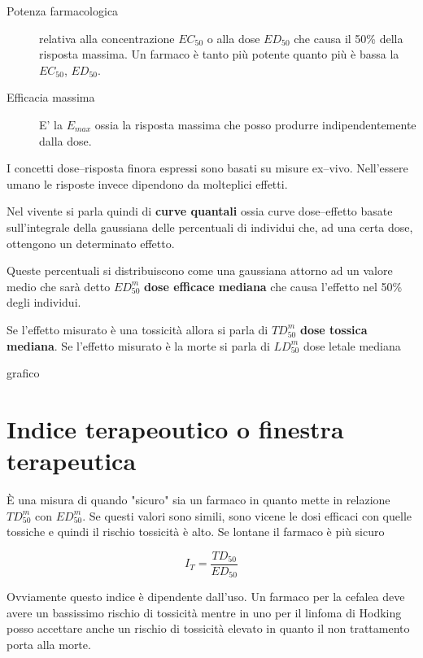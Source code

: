 \begin{description}
\item[Potenza farmacologica] relativa alla concentrazione $EC_{50}$ o alla dose $ED_{50}$ che causa il 50\% della risposta massima. Un farmaco è tanto più potente quanto più è bassa la $EC_{50}$, $ED_{50}$.

\item[Efficacia massima] E' la $E_{max}$ ossia la risposta massima che posso produrre indipendentemente dalla dose.
\end{description}

I concetti dose--risposta finora espressi sono basati su misure ex--vivo. Nell'essere umano le risposte invece dipendono da molteplici effetti.

Nel vivente si parla quindi di \textbf{curve quantali} ossia curve dose--effetto basate sull'integrale della gaussiana delle percentuali di individui che, ad una certa dose, ottengono un determinato effetto.

Queste percentuali si distribuiscono come una gaussiana attorno ad un valore medio che sarà detto $ED_{50}^m$ \textbf{dose efficace mediana} che causa l'effetto nel 50\% degli individui.

Se l'effetto misurato è una tossicità allora si parla di $TD_{50}^m$ \textbf{dose tossica mediana}. Se l'effetto misurato è la morte si parla di $LD_{50}^m$ dose letale mediana

{grafico}

\section{Indice terapeoutico o finestra terapeutica}

\`E una misura di quando "sicuro" sia un farmaco in quanto mette in relazione $TD_{50}^m$ con $ED_{50}^m$. Se questi valori sono simili, sono vicene le dosi efficaci con quelle tossiche e quindi il rischio tossicità è alto. Se lontane il farmaco è più sicuro

$$I_T=\frac{TD_{50}}{ED_{50}}$$

Ovviamente questo indice è dipendente dall'uso. Un farmaco per la cefalea deve avere un bassissimo rischio di tossicità mentre in uno per il linfoma di Hodking posso accettare anche un rischio di tossicità elevato in quanto il non trattamento porta alla morte.


